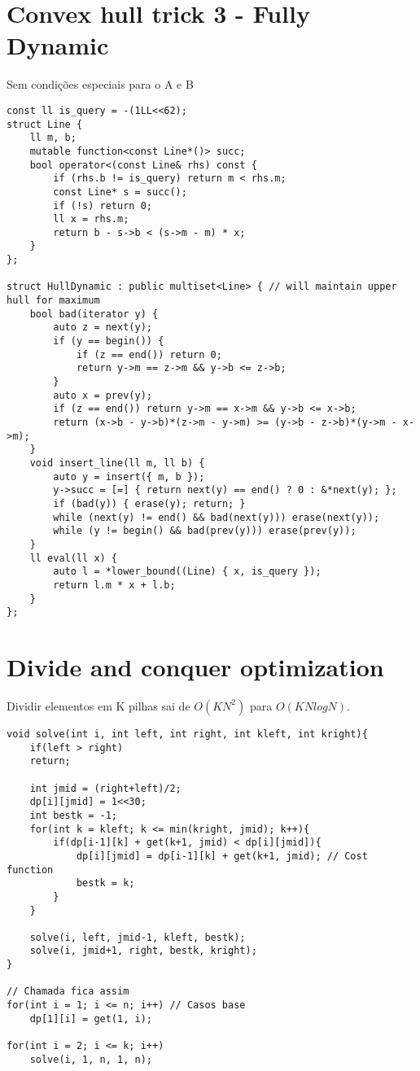 \section{Convex hull trick 3 - Fully Dynamic}

Sem condições especiais para o A e B

\begin{multicols}{2}
\begin{lstlisting}
const ll is_query = -(1LL<<62);
struct Line {
	ll m, b;
	mutable function<const Line*()> succ;
	bool operator<(const Line& rhs) const {
		if (rhs.b != is_query) return m < rhs.m;
		const Line* s = succ();
		if (!s) return 0;
		ll x = rhs.m;
		return b - s->b < (s->m - m) * x;
	}
};

struct HullDynamic : public multiset<Line> { // will maintain upper hull for maximum
	bool bad(iterator y) {
		auto z = next(y);
		if (y == begin()) {
			if (z == end()) return 0;
			return y->m == z->m && y->b <= z->b;
		}
		auto x = prev(y);
		if (z == end()) return y->m == x->m && y->b <= x->b;
		return (x->b - y->b)*(z->m - y->m) >= (y->b - z->b)*(y->m - x->m);
	}
	void insert_line(ll m, ll b) {
		auto y = insert({ m, b });
		y->succ = [=] { return next(y) == end() ? 0 : &*next(y); };
		if (bad(y)) { erase(y); return; }
		while (next(y) != end() && bad(next(y))) erase(next(y));
		while (y != begin() && bad(prev(y))) erase(prev(y));
	}
	ll eval(ll x) {
		auto l = *lower_bound((Line) { x, is_query });
		return l.m * x + l.b;
	}
};
\end{lstlisting}
\end{multicols}

\section{Divide and conquer optimization}

Dividir elementos em K pilhas sai de $O(KN^2)$ para $O(KNlogN)$.

\begin{multicols}{2}
\begin{lstlisting}
void solve(int i, int left, int right, int kleft, int kright){
	if(left > right)
	return;
	
	int jmid = (right+left)/2;
	dp[i][jmid] = 1<<30;
	int bestk = -1;
	for(int k = kleft; k <= min(kright, jmid); k++){
		if(dp[i-1][k] + get(k+1, jmid) < dp[i][jmid]){
			dp[i][jmid] = dp[i-1][k] + get(k+1, jmid); // Cost function
			bestk = k;
		}
	}
	
	solve(i, left, jmid-1, kleft, bestk);
	solve(i, jmid+1, right, bestk, kright);		
}

// Chamada fica assim
for(int i = 1; i <= n; i++) // Casos base
	dp[1][i] = get(1, i);

for(int i = 2; i <= k; i++)
	solve(i, 1, n, 1, n);
\end{lstlisting}
\end{multicols}

